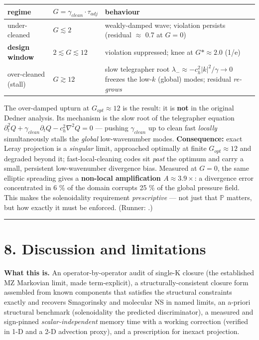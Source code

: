 \documentclass[11pt]{article}
\begin{document}
\begin{center}\small
\begin{tabularx}{\linewidth}{>{\raggedright\arraybackslash}X>{\raggedright\arraybackslash}X>{\raggedright\arraybackslash}X}
\toprule
regime & $G = \gamma _{clean}\cdot \tau _{adj}$ & behaviour \\
\midrule
under-cleaned & $G \lesssim  2$ & weakly-damped wave; violation persists (residual \ensuremath{\approx} 0.7 at $G=0$) \\
\textbf{design window} & \textbf{$2 \lesssim  G \lesssim  12$} & violation suppressed; knee at $G*\approx 2.0$ (1/e) \\
over-cleaned (stall) & $G \gtrsim  12$ & slow telegrapher root $\lambda _{-} \approx  -c_{h}^{2}|k|^{2}/\gamma  \to  0$ freezes the low-$k$ (global) modes; residual \emph{re-grows} \\
\bottomrule
\end{tabularx}
\end{center}


The over-damped upturn at $G_{opt}\approx 12$ is the result: it is \textbf{not} in the original Dedner analysis. Its mechanism is the slow root of the telegrapher equation $\partial _{t}^{2}Q + \gamma _{clean} \partial _{t} Q - c_{h}^{2}\nabla ^{2}Q = 0$ — pushing $\gamma _{clean}$ up to clean fast \emph{locally} simultaneously stalls the \emph{global} low-wavenumber modes. \textbf{Consequence:} exact Leray projection is a \emph{singular} limit, approached optimally at finite $G_{opt}\approx 12$ and degraded beyond it; fast-local-cleaning codes sit \emph{past} the optimum and carry a small, persistent low-wavenumber divergence bias. Measured at $G=0$, the same elliptic spreading gives a \textbf{non-local amplification $A\approx 3.9\times $}: a divergence error concentrated in 6 \% of the domain corrupts 25 \% of the global pressure field. This makes the solenoidality requirement \emph{prescriptive} — not just that $\mathbb{P}$ matters, but how exactly it must be enforced. (Runner: .)


\medskip\hrule\medskip


\section*{8. Discussion and limitations}


\textbf{What this is.} An operator-by-operator audit of single-K closure (the established MZ Markovian limit, made term-explicit), a structurally-consistent closure form assembled from known components that satisfies the structural constraints exactly and recovers Smagorinsky and molecular NS in named limits, an a-priori structural benchmark (solenoidality the predicted discriminator), a measured and sign-pinned \emph{scalar-independent} memory time with a working correction (verified in 1-D and a 2-D advection proxy), and a prescription for inexact projection.
\end{document}
